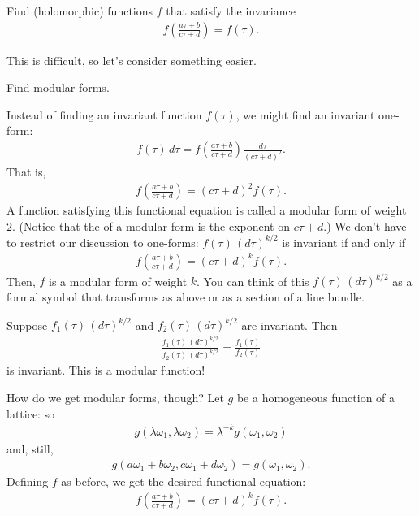 \documentclass[11pt, oneside,margin=1in]{article}
\begin{document}
\begin{problem}
	Find (holomorphic) functions $f$ that satisfy the invariance
	\begin{align*}
		f\left( \frac{a\tau + b}{c\tau +d} \right) = f(\tau).
	\end{align*}
\end{problem}

This is difficult, so let's consider something easier.

\begin{problem}
	Find modular forms.
\end{problem}

Instead of finding an invariant function $f(\tau)$, we might find an invariant one-form:
 \begin{align*}
	f(\tau)\, d\tau = f \left( \frac{a\tau + b}{c\tau + d} \right) \frac{d\tau}{(c\tau+d)^2}.
\end{align*}
That is,
\begin{align*}
f\left( \frac{a\tau+b}{c\tau +d} \right) = (c\tau+d) ^2 f(\tau).	
\end{align*}
A function satisfying this functional equation is called a modular form of weight $2$. (Notice that the  of a modular form is the exponent on $c\tau + d$.) We don't have to restrict our discussion to one-forms: $f(\tau) \, (d\tau)^{k/2}$ is invariant if and only if
\begin{align*}
	f\left( \frac{a\tau+b}{c\tau +d} \right) = (c\tau + d) ^k  f(\tau).
\end{align*}
Then, $f$ is a modular form of weight $k$. You can think of this $f(\tau)\,  (d\tau)^{k/2}$ as a formal symbol that transforms as above or as a section of a line bundle.

Suppose $f_1(\tau)\,  (d\tau)^{k/2}$ and $f_2(\tau)\,  (d\tau)^{k/2}$ are invariant. Then
\begin{align*}
	\frac{f_1(\tau) \,  (d\tau)^ {k/2}}{f_2(\tau)\,  (d\tau)^{k/2}} = \frac{f_1(\tau)}{f_2(\tau)}
\end{align*}
is invariant. This is a modular function! 

How do we get modular forms, though? Let $g$ be a homogeneous function of a lattice: so
\begin{align*}
	g (\lambda\omega_1,\lambda\omega_2) = \lambda^{-k} g(\omega_1,\omega_2)
\end{align*}
and, still,
\begin{align*}
	g(a\omega_1+b\omega_2,c\omega_1+d\omega_2) = g(\omega_1,\omega_2).
\end{align*}
Defining $f$ as before, we get the desired functional equation:
\begin{align*}
	f\left( \frac{a\tau+b}{c\tau+d} \right) = (c\tau+d) ^k f(\tau).
\end{align*}
\end{document}
